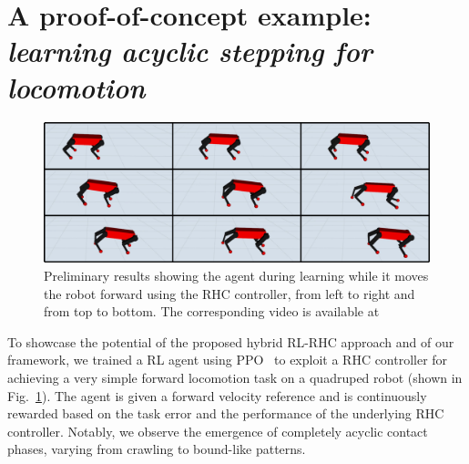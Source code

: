 \section{A proof-of-concept example: \textnormal{\textit{learning acyclic stepping for locomotion}}}
\begin{figure}[t]
	\centering
	\includegraphics[width=0.9\columnwidth]{imgs/proof_of_concept.pdf}
	\caption{Preliminary results showing the agent during learning while it moves the robot forward using the RHC controller, from left to right and from top to bottom. The corresponding video is available at~\cite{web::poc_link}}
	\vspace{-0.3cm}
	\label{fig:proof}
\end{figure}
To showcase the potential of the proposed hybrid RL-RHC approach and of our framework, we trained a RL agent using PPO~\cite{rl:schulman2017proximal} to exploit a RHC controller for achieving a very simple forward locomotion task on a quadruped robot (shown in Fig.~\ref{fig:proof}). The agent is given a forward velocity reference and is continuously rewarded based on the task error and the performance of the underlying RHC controller. Notably, we observe the emergence of completely acyclic contact phases, varying from crawling to bound-like patterns.
 